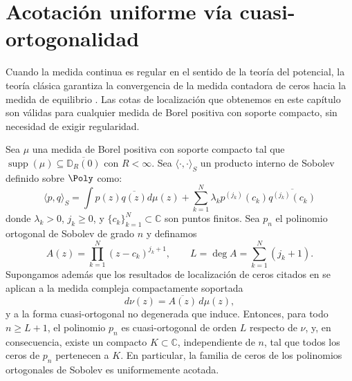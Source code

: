 \section{Acotación uniforme vía cuasi-ortogonalidad}\label{sec:cuasi_ortogonalidad}

Cuando la medida continua es regular en el sentido de la teoría del potencial, la teoría clásica garantiza la convergencia de la medida contadora de ceros hacia la medida de equilibrio \cite{stahl1992general}. Las cotas de localización que obtenemos en este capítulo son válidas para cualquier medida de Borel positiva con soporte compacto, sin necesidad de exigir regularidad.

\begin{thm}\label{thm:acotacion_ceros}
	Sea $\mu$ una medida de Borel positiva con soporte compacto tal que $\operatorname{supp}(\mu) \subseteq \overline{\mathbb{D}_R(0)}$ con $R < \infty$. Sea $\langle \cdot, \cdot \rangle_S$ un producto interno de Sobolev definido sobre $\Poly$ como:
	\begin{equation}\label{eq:sobolev_general}
		\langle p, q \rangle_S = \int p(z)\overline{q(z)} d\mu(z) + \sum_{k=1}^N \lambda_k p^{(j_k)}(c_k) \overline{q^{(j_k)}(c_k)}
	\end{equation}
	donde $\lambda_k > 0$, $j_k \ge 0$, y $\{c_k\}_{k=1}^N \subset \mathbb{C}$ son puntos finitos. Sea $p_n$ el polinomio ortogonal de Sobolev de grado $n$ y definamos
	\[
		A(z)=\prod_{k=1}^N (z-c_k)^{j_k+1},
		\qquad
		L = \deg A = \sum_{k=1}^N (j_k+1).
	\]
	Supongamos además que los resultados de localización de ceros citados en
	\cite{lopez1999zero,lopez2001sobolev,marcellan2015sobolev} se aplican a la
	medida compleja compactamente soportada
	\[
		d\nu(z)=\overline{A(z)}\,d\mu(z),
	\]
	y a la forma cuasi-ortogonal no degenerada que induce. Entonces, para todo $n \ge L+1$, el polinomio $p_n$ es cuasi-ortogonal de orden $L$ respecto de $\nu$,
	y, en consecuencia, existe un compacto $K \subset \mathbb{C}$, independiente de $n$, tal que todos los ceros de $p_n$ pertenecen a $K$. En particular, la familia de ceros de los polinomios ortogonales de Sobolev es uniformemente acotada.
\end{thm}

